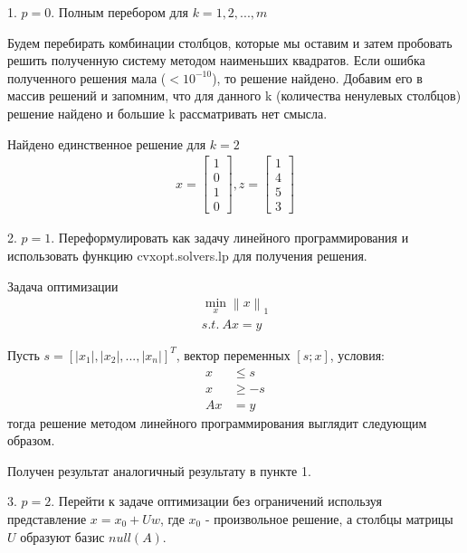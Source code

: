 \documentclass{article}
\newcommand{\norm}[1]{\left\lVert#1\right\rVert}
\begin{document}
    1. $p = 0$. Полным перебором для $k = 1, 2, ..., m $
    \bigbreak
    
    Будем перебирать комбинации столбцов, которые мы оставим и затем пробовать решить полученную систему методом наименьших квадратов. Если ошибка полученного решения мала ($ < 10^{-10} $), то решение найдено. Добавим его в массив решений и запомним, что для данного k (количества ненулевых столбцов) решение найдено и большие k рассматривать нет смысла.
    
    
    Найдено единственное решение для $k = 2$
    \begin{align*}
        x = \left[\begin{matrix} 1\\ 0\\ 1\\ 0 \end{matrix}\right], 
        z = \left[\begin{matrix} 1\\ 4\\ 5\\ 3 \end{matrix}\right]
    \end{align*}
    \newpage
    
    2. $p = 1$. Переформулировать как задачу линейного программирования и использовать функцию cvxopt.solvers.lp для получения решения.
    \bigbreak
    
    Задача оптимизации
    \begin{align*}
        \min_{x} \norm{x}_1\\
        s.t. \: Ax = y
    \end{align*}
    
    Пусть $s = [|x_1|, |x_2|, ..., |x_n|]^T$, вектор переменных $ [s; x] $, условия:
    \begin{align*}
        x &\le s\\
        x &\ge -s\\
        Ax &= y
    \end{align*}
    тогда решение методом линейного программирования выглядит следующим образом.
    
    
    
    Получен результат аналогичный результату в пункте 1.
    \newpage
    
    3. $p = 2$. Перейти к задаче оптимизации без ограничений используя представление $x = x_0 + Uw$, где $x_0$ - произвольное решение, а столбцы матрицы $U$ образуют базис $null(A)$.
    \bigbreak
    
\end{document}

